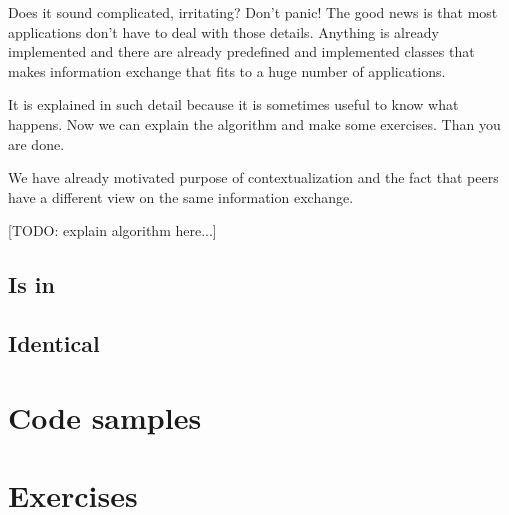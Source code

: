 Does it sound complicated, irritating? Don't panic! The good news is that most applications don't have to deal with those details. Anything is already implemented and there are already predefined and implemented classes that makes
information exchange that fits to a huge number of applications. 

It is explained in such detail because it is sometimes useful to know what happens. Now we can explain the algorithm and make some exercises. Than you are done.

We have already motivated purpose of contextualization and the fact that peers have a different view on the same information exchange. 

[TODO: explain algorithm here...]

\subsection{Is in}

\subsection{Identical}

\section{Code samples}

\section{Exercises}
